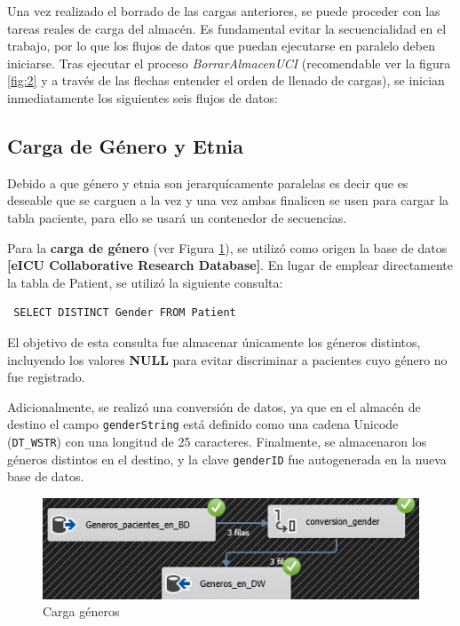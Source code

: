 \documentclass[12pt, a4paper, twoside]{article}
\begin{document}
	Una vez realizado el borrado de las cargas anteriores, se puede proceder con las tareas reales de carga del almacén. Es fundamental evitar la secuencialidad en el trabajo, por lo que los flujos de datos que puedan ejecutarse en paralelo deben iniciarse. Tras ejecutar el proceso \textit{BorrarAlmacenUCI} (recomendable ver la figura \ref{fig:2} y a través de las flechas entender el orden de llenado de cargas), se inician inmediatamente los siguientes seis flujos de datos:
	
	

	
	
	\subsection{Carga de Género y Etnia}
	
	 Debido a que género y etnia son jerarquícamente paralelas es decir que es deseable que se carguen a la vez y una vez ambas finalicen se usen para cargar la tabla paciente, para ello se usará un contenedor de secuencias.
	
	Para la \textbf{carga de género} (ver Figura \ref{fig:10}), se utilizó como origen la base de datos \textbf{[eICU Collaborative Research Database]}. En lugar de emplear directamente la tabla de Patient, se utilizó la siguiente consulta:
	
	\begin{verbatim} SELECT DISTINCT Gender FROM Patient \end{verbatim}
	
	El objetivo de esta consulta fue almacenar únicamente los géneros distintos, incluyendo los valores \textbf{NULL} para evitar discriminar a pacientes cuyo género no fue registrado.
	
	Adicionalmente, se realizó una conversión de datos, ya que en el almacén de destino el campo \texttt{genderString} está definido como una cadena Unicode (\texttt{DT\_WSTR}) con una longitud de 25 caracteres. Finalmente, se almacenaron los géneros distintos en el destino, y la clave \texttt{genderID} fue autogenerada en la nueva base de datos.
	
	\begin{figure}[H]
		\centering
		\includegraphics[width=1\textwidth]{image/106_carga_generos.png}
		\caption{Carga géneros}
		\label{fig:10}
	\end{figure}
	
\end{document}
